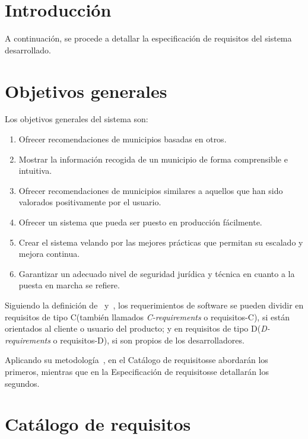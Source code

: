 
\section{Introducción}

A continuación, se procede a detallar la especificación de requisitos del sistema desarrollado.

\section{Objetivos generales}

Los objetivos generales del sistema son:

\begin{enumerate}
    \item Ofrecer recomendaciones de municipios basadas en otros.
    \item Mostrar la información recogida de un municipio de forma comprensible e intuitiva.
    \item Ofrecer recomendaciones de municipios similares a aquellos que han sido valorados positivamente por el usuario.
    \item Ofrecer un sistema que pueda ser puesto en producción fácilmente.
    \item Crear el sistema velando por las mejores prácticas que permitan su escalado y mejora continua.
    \item Garantizar un adecuado nivel de seguridad jurídica y técnica en cuanto a la puesta en marcha se refiere.
\end{enumerate}

Siguiendo la definición de~\cite{rombach} y~\cite{brackett}, los requerimientos de software se pueden dividir en requisitos de tipo \guillemotleft C\guillemotright\space (también llamados \textit{C-requirements} o requisitos-C), si están orientados al cliente o usuario del producto; y en requisitos de tipo \guillemotleft D\guillemotright\space (\textit{D-requirements} o requisitos-D), si son propios de los desarrolladores.

Aplicando su metodología~\cite{usal_inso_i}, en el \guillemotleft Catálogo de requisitos\guillemotright\space se abordarán los primeros, mientras que en la \guillemotleft Especificación de requisitos\guillemotright\space se detallarán los segundos.

\section{Catálogo de requisitos}

